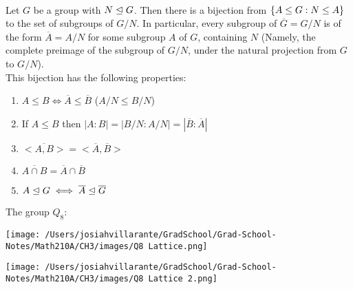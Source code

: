 \begin{theorem} \leavevmode \\
    \label{thm20}
    Let $G$ be a group with $N \trianglelefteq G$. Then there is a bijection from $\left\{A \leq G : N \leq A\right\}$ to the set of subgroups of $G/N$. In particular, every subgroup of $\overline{G} = G/N$ is of the form $\overline{A} = A/N$ for some subgroup $A$ of $G$, containing $N$ (Namely, the complete preimage of the subgroup of $G/N$, under the natural projection from $G$ to $G/N$). \\

    This bijection has the following properties:
    \begin{enumerate}
        \item $A\leq B \iff \overline{A} \leq \overline{B}$ ($A/N \leq B/N$)
        \item If $A \leq B$ then $|A:B| = |B/N : A/N| = |\overline{B} : \overline{A}|$
        \item $\overline{<A,B>} = <\overline{A}, \overline{B}>$
        \item $\overline{A\cap B} = \overline{A} \cap \overline{B}$
        \item $A \trianglelefteq G \iff \overline{A} \trianglelefteq \overline{G}$
    \end{enumerate}
\end{theorem}

\begin{example}
    The group $Q_8:$

    \texttt{[image: /Users/josiahvillarante/GradSchool/Grad-School-Notes/Math210A/CH3/images/Q8 Lattice.png]}

    \texttt{[image: /Users/josiahvillarante/GradSchool/Grad-School-Notes/Math210A/CH3/images/Q8 Lattice 2.png]}
\end{example}